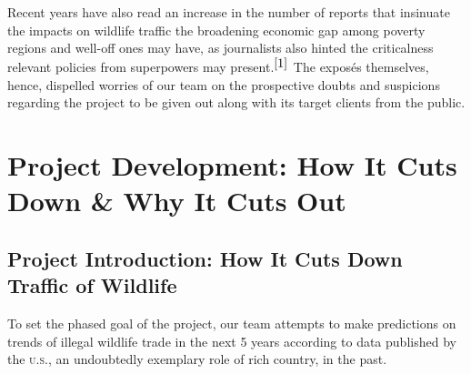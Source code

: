 \documentclass[12pt]{article}
\begin{document}
Recent years have also read an increase in the number of reports that insinuate the impacts on wildlife traffic the broadening economic gap among poverty regions and well-off ones may have, as journalists also hinted the criticalness relevant policies from superpowers may present.$^{\cite{1}}$ The exposés themselves, hence, dispelled worries of our team on the prospective doubts and suspicions regarding the project to be given out along with its target clients from the public.

\section{Project Development: How It Cuts Down \& Why It Cuts Out}

\subsection{Project Introduction: How It Cuts Down Traffic of Wildlife}
To set the phased goal of the project, our team attempts to make predictions on trends of illegal wildlife trade in the next 5 years according to data published by the \textsc{u.s.}, an undoubtedly exemplary role of rich country, in the past.
\end{document}
